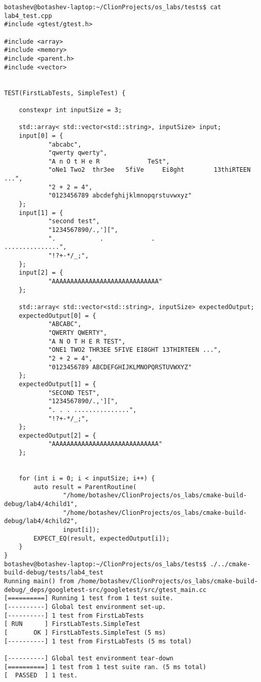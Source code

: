 \documentclass[pdf, unicode, 12pt, a4paper,oneside,fleqn]{article}
\begin{document}
\begin{verbatim}
botashev@botashev-laptop:~/ClionProjects/os_labs/tests$ cat lab4_test.cpp 
#include <gtest/gtest.h>

#include <array>
#include <memory>
#include <parent.h>
#include <vector>


TEST(FirstLabTests, SimpleTest) {

    constexpr int inputSize = 3;

    std::array< std::vector<std::string>, inputSize> input;
    input[0] = {
            "abcabc",
            "qwerty qwerty",
            "A n O t H e R             TeSt",
            "oNe1 Two2  thr3ee   5fiVe     Ei8ght        13thiRTEEN             ...",
            "2 + 2 = 4",
            "0123456789 abcdefghijklmnopqrstuvwxyz"
    };
    input[1] = {
            "second test",
            "1234567890/.,'][",
            ".            .             .                         ...............",
            "!?+-*/_;",
    };
    input[2] = {
            "AAAAAAAAAAAAAAAAAAAAAAAAAAAAA"
    };

    std::array< std::vector<std::string>, inputSize> expectedOutput;
    expectedOutput[0] = {
            "ABCABC",
            "QWERTY QWERTY",
            "A N O T H E R TEST",
            "ONE1 TWO2 THR3EE 5FIVE EI8GHT 13THIRTEEN ...",
            "2 + 2 = 4",
            "0123456789 ABCDEFGHIJKLMNOPQRSTUVWXYZ"
    };
    expectedOutput[1] = {
            "SECOND TEST",
            "1234567890/.,'][",
            ". . . ...............",
            "!?+-*/_;",
    };
    expectedOutput[2] = {
            "AAAAAAAAAAAAAAAAAAAAAAAAAAAAA"
    };


    for (int i = 0; i < inputSize; i++) {
        auto result = ParentRoutine(
                "/home/botashev/ClionProjects/os_labs/cmake-build-debug/lab4/4child1",
                "/home/botashev/ClionProjects/os_labs/cmake-build-debug/lab4/4child2",
                input[i]);
        EXPECT_EQ(result, expectedOutput[i]);
    }
}
botashev@botashev-laptop:~/ClionProjects/os_labs/tests$ ./../cmake-build-debug/tests/lab4_test 
Running main() from /home/botashev/ClionProjects/os_labs/cmake-build-debug/_deps/googletest-src/googletest/src/gtest_main.cc
[==========] Running 1 test from 1 test suite.
[----------] Global test environment set-up.
[----------] 1 test from FirstLabTests
[ RUN      ] FirstLabTests.SimpleTest
[       OK ] FirstLabTests.SimpleTest (5 ms)
[----------] 1 test from FirstLabTests (5 ms total)

[----------] Global test environment tear-down
[==========] 1 test from 1 test suite ran. (5 ms total)
[  PASSED  ] 1 test.
\end{verbatim}
\end{document}
